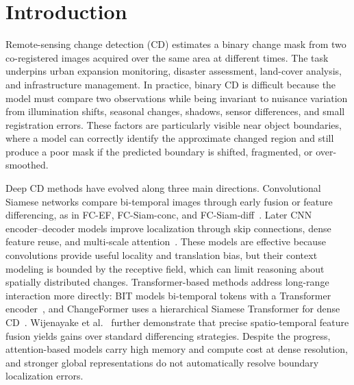 \section{Introduction}
\label{sec:introduction}

Remote-sensing change detection (CD) estimates a binary change mask from two co-registered images acquired over the same area at different times. The task underpins urban expansion monitoring, disaster assessment, land-cover analysis, and infrastructure management. In practice, binary CD is difficult because the model must compare two observations while being invariant to nuisance variation from illumination shifts, seasonal changes, shadows, sensor differences, and small registration errors. These factors are particularly visible near object boundaries, where a model can correctly identify the approximate changed region and still produce a poor mask if the predicted boundary is shifted, fragmented, or over-smoothed.

Deep CD methods have evolved along three main directions. Convolutional Siamese networks compare bi-temporal images through early fusion or feature differencing, as in FC-EF, FC-Siam-conc, and FC-Siam-diff~\cite{daudt2018fully}. Later CNN encoder--decoder models improve localization through skip connections, dense feature reuse, and multi-scale attention~\cite{ronneberger2015unet,fang2022snunet,chen2021dasnet}. These models are effective because convolutions provide useful locality and translation bias, but their context modeling is bounded by the receptive field, which can limit reasoning about spatially distributed changes. Transformer-based methods address long-range interaction more directly: BIT models bi-temporal tokens with a Transformer encoder~\cite{chen2022bit}, and ChangeFormer uses a hierarchical Siamese Transformer for dense CD~\cite{bandara2022changeformer}. Wijenayake et al.~\cite{precision_spatiotemporal_fusion_iciis2025} further demonstrate that precise spatio-temporal feature fusion yields gains over standard differencing strategies. Despite the progress, attention-based models carry high memory and compute cost at dense resolution, and stronger global representations do not automatically resolve boundary localization errors.

